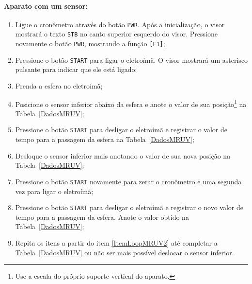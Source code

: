 \paragraph{Aparato com um sensor:}

\begin{enumerate}
    \item Ligue o cronômetro através do botão \texttt{PWR}. Após a inicialização, o visor mostrará o texto \texttt{STB} no canto superior esquerdo do visor. Pressione novamente o botão \texttt{PWR}, mostrando a função \texttt{[F1]};
    \item Pressione o botão \texttt{START} para ligar o eletroímã. O visor mostrará um asterisco pulsante para indicar que ele está ligado;
	\item Prenda a esfera no eletroímã;
	\item Posicione o sensor inferior  abaixo da esfera e anote o valor de sua posição\footnote{Use a escala do próprio suporte vertical do aparato.} na Tabela~\ref{DadosMRUV};
	\item Pressione o botão \texttt{START} para desligar o eletroímã e registrar o valor de tempo para a passagem da esfera na Tabela~\ref{DadosMRUV};
	\item Desloque o sensor inferior mais  anotando o valor de sua nova posição na Tabela~\ref{DadosMRUV};\label{ItemLoopMRUV2}
	\item Pressione o botão \texttt{START} novamente para zerar o cronômetro e uma segunda vez para ligar o eletroímã;
	\item Pressione o botão \texttt{START} para desligar o eletroímã e registrar o novo valor de tempo para a passagem da esfera. Anote o valor obtido na Tabela~\ref{DadosMRUV};
	\item Repita os itens a partir do item \ref{ItemLoopMRUV2} até completar a Tabela~\ref{DadosMRUV} ou não ser mais possível deslocar o sensor inferior.
\end{enumerate}

\cleardoublepage


